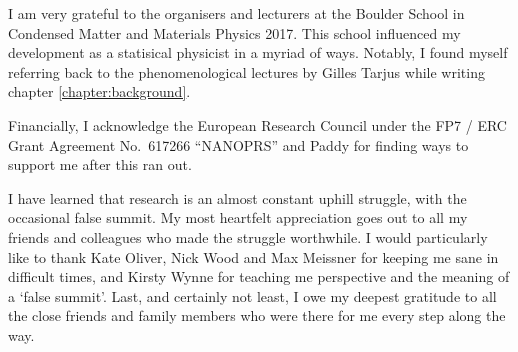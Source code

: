 I am very grateful to the organisers and lecturers at the Boulder School in Condensed Matter and Materials Physics 2017.
This school influenced my development as a statisical physicist in a myriad of ways.
Notably, I found myself referring back to the phenomenological lectures by Gilles Tarjus while writing chapter \ref{chapter:background}.

Financially, I acknowledge the European Research Council under the FP7 / ERC Grant Agreement No.\ 617266 ``NANOPRS'' and Paddy for finding ways to support me after this ran out.

I have learned that research is an almost constant uphill struggle, with the occasional false summit.
My most heartfelt appreciation goes out to all my friends and colleagues who made the struggle worthwhile.
I would particularly like to thank Kate Oliver, Nick Wood and Max Meissner for keeping me sane in difficult times, and Kirsty Wynne for teaching me perspective and the meaning of a `false summit'.
Last, and certainly not least, I owe my deepest gratitude to all the close friends and family members who were there for me every step along the way.

